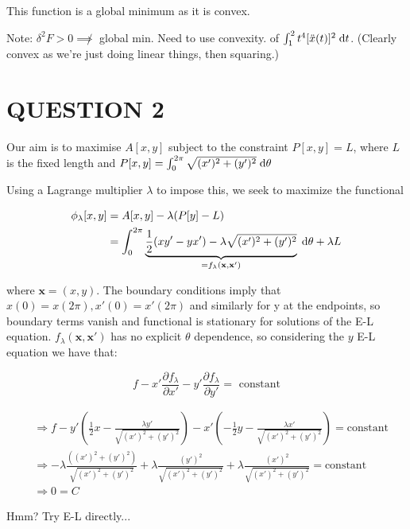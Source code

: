 \documentclass[a4paper]{article}
\begin{document}
This function is a global minimum as it is convex. 

Note: $ \delta^{2} F > 0 \not \implies  $ global min. Need to use convexity. of $ \int_{1}^{2} t^{4} [ \ddot{x}(t) ]^{2} \; \mathrm{d} t $. (Clearly convex as we're just doing linear things, then squaring.)

\section{QUESTION 2}


Our aim is to maximise $ A[x,y] $ subject to the constraint $ P[x,y] = L $, where $ L $ is the fixed length and $ P[x,y] = \int_{0}^{2\pi} \sqrt{  (x')^{2}  + (y')^{2} } \; \mathrm{d} \theta  $

Using a Lagrange multiplier $ \lambda $ to impose this, we seek to maximize the functional

\begin{align*}
\phi_{\lambda}[x,y]  & = A[x,y] - \lambda ( P[y] - L )  \\
& = \int_{0}^{2 \pi} \underbrace{\frac{1}{2} ( xy' - yx' ) - \lambda \sqrt{  (x')^{2}  + (y')^{2} }}_{=f_{\lambda}(\mathbf{x},\mathbf{x}')} \; \mathrm{d} \theta + \lambda L
\end{align*}

where $ \mathbf{x} = (x,y) $. The boundary conditions imply that $ x(0) = x(2\pi), x'(0) = x'(2\pi) $ and similarly for y at the endpoints, so boundary terms vanish and functional is stationary for solutions of the E-L equation.  $ f_{\lambda}(\mathbf{x},\mathbf{x}') $ has no explicit $ \theta $ dependence, so considering the $ y $ E-L equation we have that:

\[ f - x'\frac{\partial f_{\lambda} }{\partial x'}  - y'\frac{\partial f_{\lambda} }{\partial y'}  = \text{ constant}  \]

\begin{align*}
& \Rightarrow f - y' \left(  \frac{1}{2} x - \frac{\lambda y'}{\sqrt{  (x')^{2}  + (y')^{2} }} \right)  - x'\left(  - \frac{1}{2} y - \frac{\lambda x'}{\sqrt{  (x')^{2}  + (y')^{2} }}   \right)    = \text{constant} \\
& \Rightarrow  - \lambda \frac{ ( (x')^{2}  + (y')^{2} )}{\sqrt{  (x')^{2}  + (y')^{2} }} + \lambda \frac{(y')^{2}}{\sqrt{  (x')^{2}  + (y')^{2} }} + \lambda \frac{(x')^{2}}{\sqrt{  (x')^{2}  + (y')^{2} }} = \text{constant} \\
& \Rightarrow 0 = C
\end{align*}

Hmm?
Try E-L directly...
\end{document}
